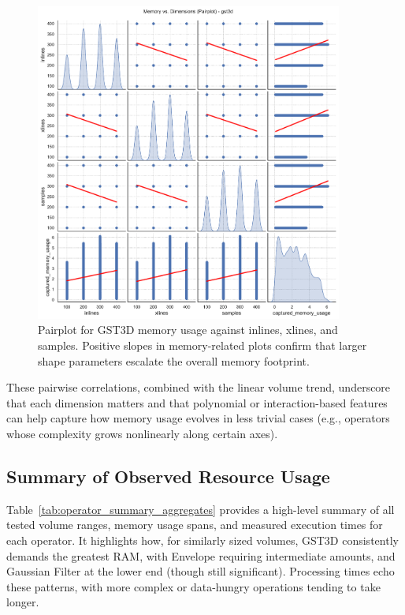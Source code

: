 \begin{figure}[htbp]
    \centering
    \includegraphics[width=0.9\textwidth]{assets/images/05/memory_vs_dimensions_pairplot_gst3d}
    \caption{Pairplot for \ac{GST3D} memory usage against inlines, xlines, and samples. Positive slopes in memory-related plots confirm that larger shape parameters escalate the overall memory footprint.}
    \label{fig:memory_vs_dimensions_pairplot_gst3d}
\end{figure}

These pairwise correlations, combined with the linear volume trend, underscore that each dimension matters and that polynomial or interaction-based features can help capture how memory usage evolves in less trivial cases (e.g., operators whose complexity grows nonlinearly along certain axes).

\subsection{Summary of Observed Resource Usage}
\label{subsec:resource-usage-summary}

Table~\ref{tab:operator_summary_aggregates} provides a high-level summary of all tested volume ranges, memory usage spans, and measured execution times for each operator.
It highlights how, for similarly sized volumes, \ac{GST3D} consistently demands the greatest \ac{RAM}, with Envelope requiring intermediate amounts, and Gaussian Filter at the lower end (though still significant).
Processing times echo these patterns, with more complex or data-hungry operations tending to take longer.

